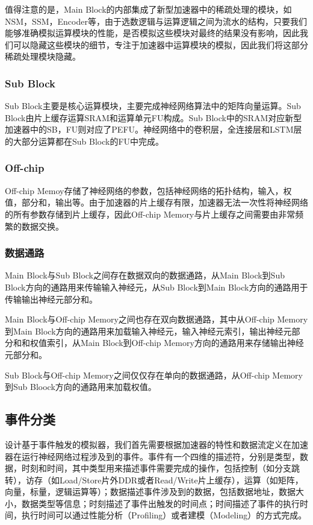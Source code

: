 值得注意的是，Main Block的内部集成了新型加速器中的稀疏处理的模块，如NSM，SSM，Encoder等，由于选数逻辑与运算逻辑之间为流水的结构，只要我们能够准确模拟运算模块的性能，是否模拟这些模块对最终的结果没有影响，因此我们可以隐藏这些模块的细节，专注于加速器中运算模块的模拟，因此我们将这部分稀疏处理模块隐藏。

\subsubsection{Sub Block}
Sub Block主要是核心运算模块，主要完成神经网络算法中的矩阵向量运算。Sub Block由片上缓存运算SRAM和运算单元FU构成。Sub Block中的SRAM对应新型加速器中的SB，FU则对应了PEFU。神经网络中的卷积层，全连接层和LSTM层的大部分运算都在Sub Block的FU中完成。

\subsubsection{Off-chip}
Off-chip Memoy存储了神经网络的参数，包括神经网络的拓扑结构，输入，权值，部分和，输出等。由于加速器的片上缓存有限，加速器无法一次性将神经网络的所有参数存储到片上缓存，因此Off-chip Memory与片上缓存之间需要由非常频繁的数据交换。

\subsubsection{数据通路}
Main Block与Sub Block之间存在数据双向的数据通路，从Main Block到Sub Block方向的通路用来传输输入神经元，从Sub Block到Main Block方向的通路用于传输输出神经元部分和。

Main Block与Off-chip Memory之间也存在双向数据通路，其中从Off-chip Memory到Main Block方向的通路用来加载输入神经元，输入神经元索引，输出神经元部分和和权值索引，从Main Block到Off-chip Memory方向的通路用来存储输出神经元部分和。

Sub Block与Off-chip Memory之间仅仅存在单向的数据通路，从Off-chip Memory到Sub Bloock方向的通路用来加载权值。


\subsection{事件分类}
设计基于事件触发的模拟器，我们首先需要根据加速器的特性和数据流定义在加速器在运行神经网络过程涉及到的事件。事件有一个四维的描述符，分别是类型，数据，时刻和时间，其中类型用来描述事件需要完成的操作，包括控制（如分支跳转），访存（如Load/Store片外DDR或者Read/Write片上缓存），运算（如矩阵，向量，标量，逻辑运算等）；数据描述事件涉及到的数据，包括数据地址，数据大小，数据类型等信息；时刻描述了事件出触发的时间点；时间描述了事件的执行时间，执行时间可以通过性能分析（Profiling）或者建模（Modeling）的方式完成。

